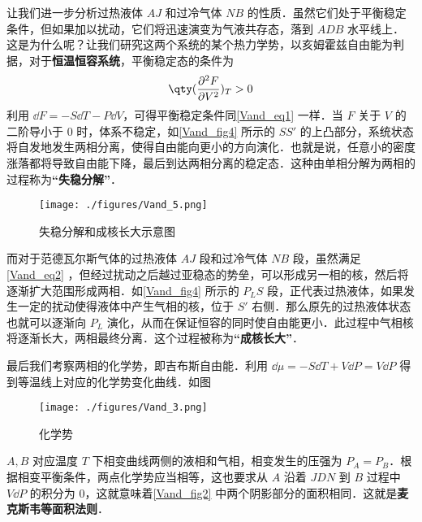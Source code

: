 让我们进一步分析过热液体 $AJ$ 和过冷气体 $NB$ 的性质．虽然它们处于平衡稳定条件，但如果加以扰动，它们将迅速演变为气液共存态，落到 $ADB$ 水平线上．这是为什么呢？让我们研究这两个系统的某个热力学势，以亥姆霍兹自由能为判据，对于\textbf{恒温恒容系统}，平衡稳定态的条件为
\begin{equation}\label{Vand_eq2}
\qty(\frac{\partial^2 F}{\partial V^2})_T>0
\end{equation}
利用 $\dd F=-S\dd T-P\dd V$，可得平衡稳定条件同\autoref{Vand_eq1} 一样．当 $F$ 关于 $V$ 的二阶导小于 $0$ 时，体系不稳定，如\autoref{Vand_fig4} 所示的 $SS'$ 的上凸部分，系统状态将自发地发生两相分离，使得自由能向更小的方向演化．也就是说，任意小的密度涨落都将导致自由能下降，最后到达两相分离的稳定态．这种由单相分解为两相的过程称为\textbf{“失稳分解”}．
\begin{figure}[ht]
\centering
\texttt{[image: ./figures/Vand\_5.png]}
\caption{失稳分解和成核长大示意图} \label{Vand_fig4}
\end{figure}
而对于范德瓦尔斯气体的过热液体 $AJ$ 段和过冷气体 $NB$ 段，虽然满足\autoref{Vand_eq2} ，但经过扰动之后越过亚稳态的势垒，可以形成另一相的核，然后将逐渐扩大范围形成两相．如\autoref{Vand_fig4} 所示的 $P_LS$ 段，正代表过热液体，如果发生一定的扰动使得液体中产生气相的核，位于 $S'$ 右侧．那么原先的过热液体状态也就可以逐渐向 $P_L$ 演化，从而在保证恒容的同时使自由能更小．此过程中气相核将逐渐长大，两相最终分离．这个过程被称为\textbf{“成核长大”}．



最后我们考察两相的化学势，即吉布斯自由能．利用 $\dd \mu=-S\dd T+V\dd P=V\dd P$ 得到等温线上对应的化学势变化曲线．如图

\begin{figure}[ht]
\centering
\texttt{[image: ./figures/Vand\_3.png]}
\caption{化学势} \label{Vand_fig3}
\end{figure}
$A,B$ 对应温度 $T$ 下相变曲线两侧的液相和气相，相变发生的压强为 $P_A=P_B$．根据相变平衡条件，两点化学势应当相等，这也要求从 $A$ 沿着 $JDN$ 到 $B$ 过程中 $V\dd P$ 的积分为 $0$，这就意味着\autoref{Vand_fig2} 中两个阴影部分的面积相同．这就是\textbf{麦克斯韦等面积法则}．